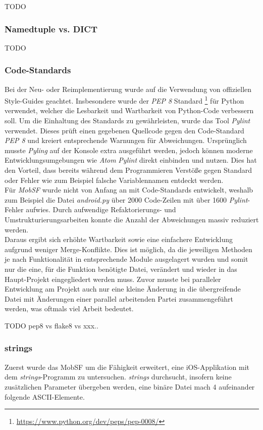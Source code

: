 TODO

\subsubsection{Namedtuple vs. DICT}
TODO

\subsubsection{Code-Standards}
\label{pylintering}
Bei der Neu- oder Reimplementierung wurde auf die Verwendung von offiziellen Style-Guides geachtet. Insbesondere wurde der\textit{ PEP 8} Standard \footnote{\url{https://www.python.org/dev/peps/pep-0008/}} für Python verwendet, welcher die Lesbarkeit und Wartbarkeit von Python-Code verbessern soll. Um die Einhaltung des Standards zu gewährleisten, wurde das Tool \textit{Pylint} verwendet. Dieses prüft einen gegebenen Quellcode gegen den Code-Standard \textit{PEP 8} und kreiert entsprechende Warnungen für Abweichungen. Ursprünglich musste \textit{Pyling} auf der Konsole extra ausgeführt werden, jedoch können moderne Entwicklungsumgebungen wie \textit{Atom} \textit{Pylint} direkt einbinden und nutzen. Dies hat den Vorteil, dass bereits während dem Programmieren Verstöße gegen Standard oder Fehler wie zum Beispiel falsche Variablennamen entdeckt werden.\\

Für \textit{MobSF} wurde nicht von Anfang an mit Code-Standards entwickelt, weshalb zum Beispiel die Datei \textit{android.py} über 2000 Code-Zeilen mit über 1600 \textit{Pylint}-Fehler aufwies. Durch aufwendige Refaktorierungs- und Umstrukturierungsarbeiten konnte die Anzahl der Abweichungen massiv reduziert werden.\\

Daraus ergibt sich erhöhte Wartbarkeit sowie eine einfachere Entwicklung aufgrund weniger Merge-Konflikte. Dies ist möglich, da die jeweiligen Methoden je nach Funktionalität in entsprechende Module ausgelagert wurden und somit nur die eine, für die Funktion benötigte Datei, verändert und wieder in das Haupt-Projekt eingegliedert werden muss. Zuvor musste bei paralleler Entwicklung am Projekt auch nur eine kleine Änderung in die übergreifende Datei mit Änderungen einer parallel arbeitenden Partei zusammengeführt werden, was oftmals viel Arbeit bedeutet.

TODO pep8 vs flake8 vs xxx..

\subsubsection{strings}\label{ref:strings}
Zuerst wurde das MobSF um die Fähigkeit erweitert, eine iOS-Applikation mit dem \textit{strings}-Programm zu untersuchen. \textit{strings} durchsucht, insofern keine zusätzlichen Parameter übergeben werden, eine binäre Datei mach 4 aufeinander folgende ASCII-Elemente.\\

